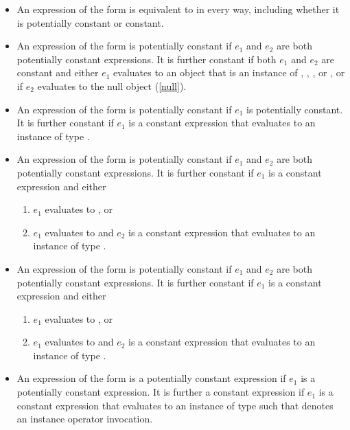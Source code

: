 \documentclass[makeidx]{article}
\begin{document}
{\begin{itemize}
\item
  An expression of the form  is
  equivalent to  in every way,
  including whether it is potentially constant or constant.

\item
  An expression of the form  is potentially constant
  if $e_1$ and $e_2$ are both potentially constant expressions.
  It is further constant if both $e_1$ and $e_2$ are constant and
  either $e_1$ evaluates to an object that is an instance of
  , , ,  or ,
  or if $e_2$ evaluates to the null object (\ref{null}).

\item
  An expression of the form  is potentially constant
  if $e_1$ is potentially constant.
  It is further constant if $e_1$ is a constant expression that evaluates to
  an instance of type .

\item
  An expression of the form  is
  potentially constant if $e_1$ and $e_2$
  are both potentially constant expressions.
  It is further constant if $e_1$ is a constant expression and either
  \begin{enumerate}
  \item $e_1$ evaluates to \FALSE{}, or
  \item $e_1$ evaluates to \TRUE{} and $e_2$ is a constant expression
    that evaluates to an instance of type .
  \end{enumerate}

\item
  An expression of the form  is
  potentially constant if $e_1$ and $e_2$
  are both potentially constant expressions.
  It is further constant if $e_1$ is a constant expression and either
  \begin{enumerate}
  \item $e_1$ evaluates to \TRUE{}, or
  \item $e_1$ evaluates to \FALSE{} and $e_2$ is a constant expression
    that evaluates to an instance of type .
  \end{enumerate}

\item
  An expression of the form  is
  a potentially constant expression
  if $e_1$ is a potentially constant expression.
  It is further a constant expression if $e_1$ is
  a constant expression that evaluates to an instance of type 
  such that \gtilde{} denotes an instance operator invocation.


\end{itemize}}
\end{document}
